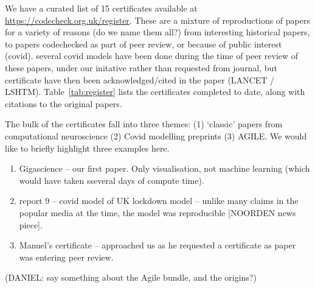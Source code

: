 \documentclass[12pt]{article}
\begin{document}
We have a curated list of 15 certificates available at
\url{https://codecheck.org.uk/register}. These are a mixture of
reproductions of papers for a variety of reasons (do we name them all?)
from interesting historical papers, to papers codechecked as part of
peer review, or because of public interest (covid). several covid models
have been done during the time of peer review of these papers, under our
initative rather than requested from journal, but certificate have then
been acknowledged/cited in the paper (LANCET / LSHTM).
Table~\ref{tab:register} lists the certificates completed to date,
along with citations to the original papers.

The bulk of the certificates fall into three themes: (1) `classic'
papers from computational neuroscience (2) Covid modelling preprints
(3) AGILE.  We would like to briefly highlight three examples here.

\begin{enumerate}
\def\labelenumi{\arabic{enumi}.}
\item
  Gigascience -- our first paper. Only visualisation, not machine
  learning (which would have taken sseveral days of compute time).
\item
  report 9 -- covid model of UK lockdown model -- unlike many claims
  in the popular media at the time, the model was reproducible
  [NOORDEN news piece]. 
\item
  Manuel's certificate -- approached us as he requested a certificate
  as paper was entering peer review.
\end{enumerate}


(DANIEL: say something about the Agile bundle, and the origins?)
\end{document}
